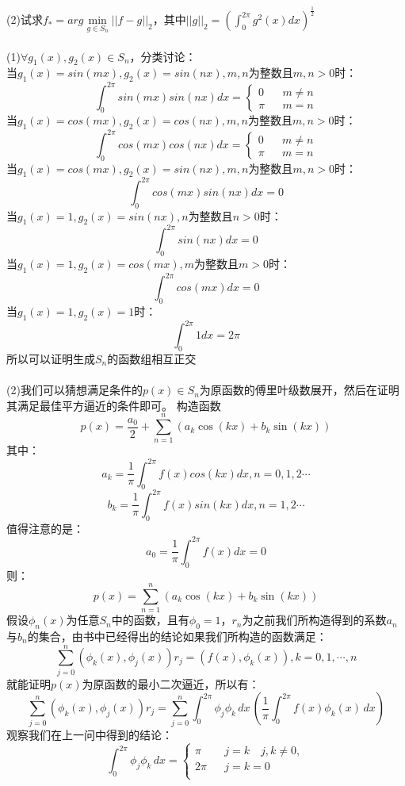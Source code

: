 \documentclass{article}
\begin{document}
\begin{itemize}
		(2)试求$f_{*} = arg \min\limits_{g\in S_{n}}||f-g||_{2}$，其中$||g||_{2} = (\int_{0}^{2\pi}g^2(x)dx)^{\frac{1}{2}}$\\\\
		(1)$\forall g_1(x), g_2(x) \in S_{n}$，分类讨论：\\
		当$g_1(x) = sin(mx), g_2(x) = sin(nx), m,n$为整数且$m, n > 0$时：
		$$\int_{0}^{2\pi}sin(mx)sin(nx)dx = \left\{ 
		\begin{array}{lcl}
		0 && m \ne n\\
		\pi && m = n
		\end{array}
		\right.$$
				当$g_1(x) = cos(mx), g_2(x) = cos(nx), m,n$为整数且$m, n > 0$时：
		$$\int_{0}^{2\pi}cos(mx)cos(nx)dx = \left\{ 
		\begin{array}{lcl}
		0 && m \ne n\\
		\pi && m = n
		\end{array}
		\right.$$
		当$g_1(x) = cos(mx), g_2(x) = sin(nx), m,n$为整数且$m, n > 0$时：
			$$\int_{0}^{2\pi}cos(mx)sin(nx)dx = 0$$
		当$g_1(x) = 1, g_2(x) = sin(nx), n$为整数且$n > 0$时：
		$$\int_{0}^{2\pi}sin(nx)dx = 0$$
		当$g_1(x) = 1, g_2(x) = cos(mx), m$为整数且$m > 0$时：
		$$\int_{0}^{2\pi}cos(mx)dx = 0$$
		当$g_1(x) = 1, g_2(x) = 1$时：
		$$\int_{0}^{2\pi}1dx = 2\pi$$
		所以可以证明生成$S_{n}$的函数组相互正交\\\\
		(2)我们可以猜想满足条件的$p(x) \in S_{n}$为原函数的傅里叶级数展开，然后在证明其满足最佳平方逼近的条件即可。
		构造函数
		$$p(x) = \frac{a_{0}}{2} + \sum_{n = 1}^{n}(a_{k}\cos (kx) + b_{k} \sin (kx))$$
		其中：
		$$a_{k} = \frac{1}{\pi}\int_{0}^{2\pi}f(x)cos(kx)dx , n= 0, 1, 2 \cdots$$
		$$b_{k} = \frac{1}{\pi}\int_{0}^{2\pi}f(x)sin(kx)dx , n= 1, 2 \cdots$$
		值得注意的是：
		$$a_{0} = \frac{1}{\pi}\int_{0}^{2\pi}f(x)dx = 0 $$
		则：
		$$p(x) = \sum_{n = 1}^{n}(a_{k}\cos (kx) + b_{k} \sin (kx))$$
		假设$\phi_{n}(x)$为任意$S_{n}$中的函数，且有$\phi_{0} = 1$，$r_n$为之前我们所构造得到的系数$a_n$与$b_n$的集合，由书中已经得出的结论如果我们所构造的函数满足：
		$$\sum_{j = 0}^{n}(\phi_{k}(x), \phi_{j}(x))r_{j} = (f(x), \phi_{k}(x)), k = 0, 1, \cdots, n$$
		就能证明$p(x)$为原函数的最小二次逼近，所以有：
		$$\sum_{j = 0}^{n}(\phi_{k}(x), \phi_{j}(x))r_{j} = \sum_{j=0}^{n} \int_{0}^{2\pi}\phi_{j}\phi_{k}\,dx \, (\frac{1}{\pi}\int_{0}^{2\pi}f(x)\phi_{k}(x)\,dx) $$
		观察我们在上一问中得到的结论：
		$$\int_{0}^{2\pi}\phi_{j}\phi_{k}\,dx = \left\{
		\begin{array}{lcl}
		\pi && j = k\quad j, k\ne 0,\\
		2\pi && j = k = 0\\

\end{array}$$
\end{itemize}
\end{document}
